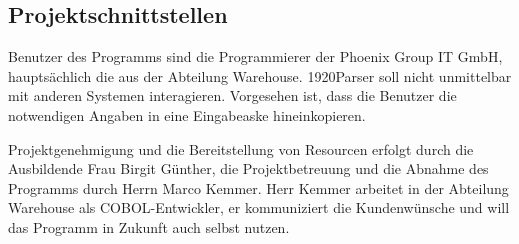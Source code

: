 \subsection{Projektschnittstellen}
\label{sec:Projektschnittstellen}
Benutzer des Programms sind die Programmierer der Phoenix Group IT GmbH, hauptsächlich die aus der Abteilung Warehouse.
1920Parser soll nicht unmittelbar mit anderen Systemen interagieren. Vorgesehen ist, dass die Benutzer die notwendigen Angaben in eine Eingabeaske hineinkopieren.

Projektgenehmigung und die Bereitstellung von Resourcen erfolgt durch die Ausbildende Frau Birgit Günther, die Projektbetreuung und die Abnahme des Programms durch Herrn Marco Kemmer. Herr Kemmer arbeitet in der Abteilung Warehouse als COBOL-Entwickler, er kommuniziert die Kundenwünsche und will das Programm in Zukunft auch selbst nutzen.


